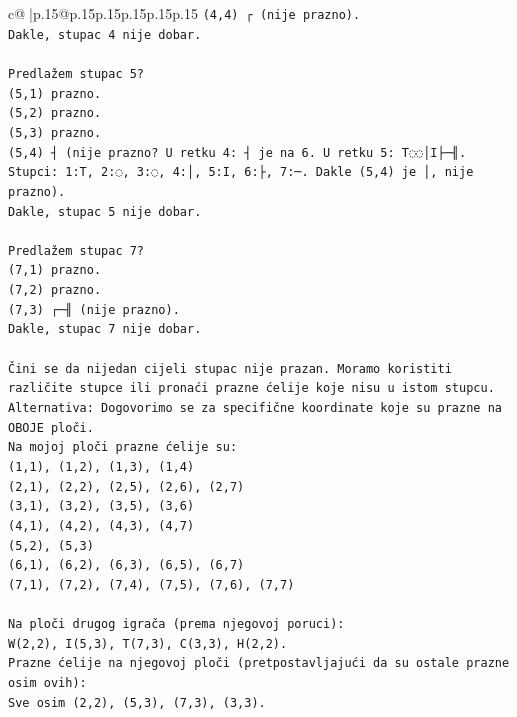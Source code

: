 \documentclass{article}
\begin{document}
{\begin{supertabular}{c@{$\;$}|p{.15\linewidth}@{}p{.15\linewidth}p{.15\linewidth}p{.15\linewidth}p{.15\linewidth}p{.15\linewidth}}
{{{\texttt{(4,4) ┌ (nije prazno).} \\
\texttt{Dakle, stupac 4 nije dobar.} \\
\\ 
\texttt{Predlažem stupac 5?} \\
\texttt{(5,1) prazno.} \\
\texttt{(5,2) prazno.} \\
\texttt{(5,3) prazno.} \\
\texttt{(5,4) ┤ (nije prazno? U retku 4: ┤ je na 6. U retku 5: T◌◌│I├─╢. Stupci: 1:T, 2:◌, 3:◌, 4:│, 5:I, 6:├, 7:─. Dakle (5,4) je │, nije prazno).} \\
\texttt{Dakle, stupac 5 nije dobar.} \\
\\ 
\texttt{Predlažem stupac 7?} \\
\texttt{(7,1) prazno.} \\
\texttt{(7,2) prazno.} \\
\texttt{(7,3) ┌─╢ (nije prazno).} \\
\texttt{Dakle, stupac 7 nije dobar.} \\
\\ 
\texttt{Čini se da nijedan cijeli stupac nije prazan. Moramo koristiti različite stupce ili pronaći prazne ćelije koje nisu u istom stupcu.} \\
\texttt{Alternativa: Dogovorimo se za specifične koordinate koje su prazne na OBOJE ploči.} \\
\texttt{Na mojoj ploči prazne ćelije su:} \\
\texttt{(1,1), (1,2), (1,3), (1,4)} \\
\texttt{(2,1), (2,2), (2,5), (2,6), (2,7)} \\
\texttt{(3,1), (3,2), (3,5), (3,6)} \\
\texttt{(4,1), (4,2), (4,3), (4,7)} \\
\texttt{(5,2), (5,3)} \\
\texttt{(6,1), (6,2), (6,3), (6,5), (6,7)} \\
\texttt{(7,1), (7,2), (7,4), (7,5), (7,6), (7,7)} \\
\\ 
\texttt{Na ploči drugog igrača (prema njegovoj poruci):} \\
\texttt{W(2,2), I(5,3), T(7,3), C(3,3), H(2,2).} \\
\texttt{Prazne ćelije na njegovoj ploči (pretpostavljajući da su ostale prazne osim ovih):} \\
\texttt{Sve osim (2,2), (5,3), (7,3), (3,3).} \\
}}}
\end{supertabular}}
\end{document}
